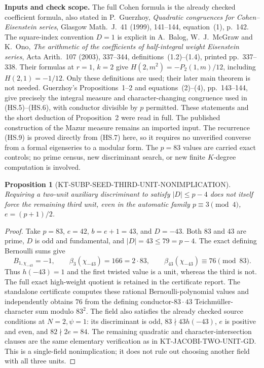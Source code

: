 \documentclass[11pt,a4paper]{article}
\newtheorem{proposition}[theorem]{Proposition}
\theoremstyle{definition}
\renewcommand{\paragraph}[1]{\par\smallskip\noindent\textbf{#1}\quad\ignorespaces}
\begin{document}
\paragraph{Inputs and check scope.}
The full Cohen formula is the already checked coefficient
formula, also stated in P.~Guerzhoy,
\emph{Quadratic congruences for Cohen--Eisenstein series},
Glasgow Math.~J.~41 (1999), 141--144, equation~(1), p.~142.
The square-index convention $D=1$ is explicit in
A.~Balog, W.~J.~McGraw and K.~Ono,
\emph{The arithmetic of the coefficients of half-integral weight
Eisenstein series}, Acta Arith.~107 (2003), 337--344,
definitions~(1.2)--(1.4), printed pp.~337--338.
Their formulas at $r=1$, $k=2$ give
$H(2,m^2)=-P_2(1,m)/12$, including $H(2,1)=-1/12$.
Only these definitions are used; their later main theorem
is not needed.
Guerzhoy's Propositions~1--2 and equations~(2)--(4), pp.~143--144,
give precisely the integral measure and character-changing
congruence used in (HS.5)--(HS.6), with conductor divisible
by $p$ permitted.
These statements and the short deduction of Proposition~2 were
read in full.  The published construction of the Mazur measure
remains an imported input.
The recurrence (HS.9) is proved directly from (HS.7) here,
so it requires no unverified converse from a formal eigenseries
to a modular form.
The $p=83$ values are carried exact controls; no prime census,
new discriminant search, or new finite $K$-degree computation
is involved.



\begin{proposition}[KT-SUBP-SEED-THIRD-UNIT-NONIMPLICATION]
Requiring a two-unit auxiliary discriminant to satisfy $|D|\leq p-4$
does not itself force the remaining third unit, even in the automatic
family $p\equiv3\pmod4$, $e=(p+1)/2$.
\end{proposition}
\begin{proof}
Take $p=83$, $e=42$, $b=e+1=43$, and $D=-43$.  Both $83$ and $43$
are prime, $D$ is odd and fundamental, and $|D|=43\leq79=p-4$.
The exact defining Bernoulli sums give
\[
 B_{1,\chi_{-43}}=-1,\qquad
 \beta_3(\chi_{-43})=166=2\cdot83,
 \qquad \beta_{43}(\chi_{-43})\equiv76\pmod{83}.
\]
Thus $h(-43)=1$ and the first twisted value is a unit, whereas the
third is not.  The full exact high-weight quotient is retained in the
certificate report.
The standalone certificate
 computes these rational
Bernoulli-polynomial values and independently obtains $76$ from the
defining conductor-$83\cdot43$ Teichm\"uller-character sum modulo $83^2$.
The field also satisfies the already checked source conditions at
$N=2,\psi=1$: its discriminant is odd, $83\nmid43h(-43)$, $e$ is
positive and even, and $82\nmid2e=84$.  The remaining quadratic and
character-intersection clauses are the same elementary verification
as in KT-JACOBI-TWO-UNIT-GD.  This is a single-field nonimplication;
it does not rule out choosing another field with all three units.
\end{proof}
\end{document}
